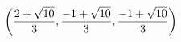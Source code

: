 \documentclass[preview]{standalone}
\begin{document}
\begin{align*}
\special{dvisvgm:raw <g id='unique000'>}\left(\dfrac{2+\sqrt{10}}{3},\dfrac{-1+\sqrt{10}}{3},\dfrac{-1+\sqrt{10}}{3}\right)\special{dvisvgm:raw </g>}
\end{align*}
\end{document}
